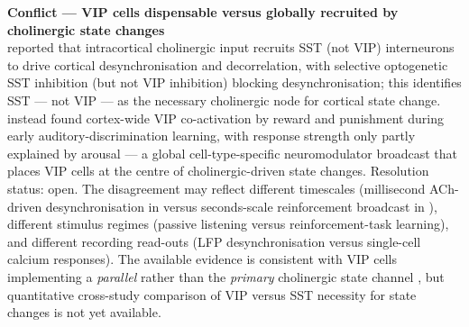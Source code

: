 \documentclass[11pt]{article}
\begin{document}
\begin{framed}
\textbf{Conflict --- VIP cells dispensable versus globally recruited by cholinergic state changes}\\
\citet{Chen2015a} reported that intracortical cholinergic input recruits SST (not VIP) interneurons to drive cortical desynchronisation and decorrelation, with selective optogenetic SST inhibition (but not VIP inhibition) blocking desynchronisation; this identifies SST --- not VIP --- as the necessary cholinergic node for cortical state change. \citet{Szadai2022} instead found cortex-wide VIP co-activation by reward and punishment during early auditory-discrimination learning, with response strength only partly explained by arousal --- a global cell-type-specific neuromodulator broadcast that places VIP cells at the centre of cholinergic-driven state changes. Resolution status: open. The disagreement may reflect different timescales (millisecond ACh-driven desynchronisation in \citet{Chen2015a} versus seconds-scale reinforcement broadcast in \citet{Szadai2022}), different stimulus regimes (passive listening versus reinforcement-task learning), and different recording read-outs (LFP desynchronisation versus single-cell calcium responses). The available evidence is consistent with VIP cells implementing a \textit{parallel} rather than the \textit{primary} cholinergic state channel \citep{Kuchibhotla2017, Pakan2016, Dipoppa2018, Yaeger2019, Ren2022}, but quantitative cross-study comparison of VIP versus SST necessity for state changes is not yet available.
\end{framed}
\end{document}
